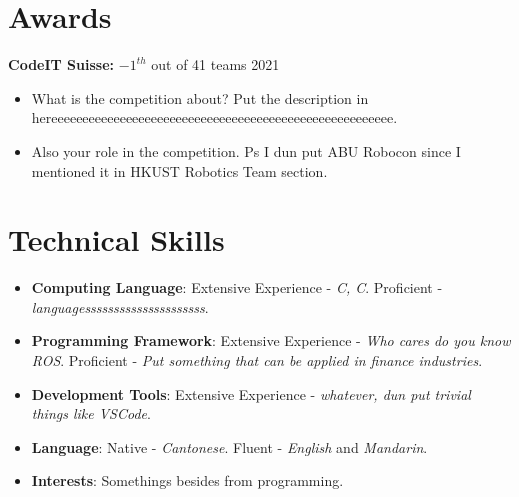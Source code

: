 \documentclass[letterpaper,10.8pt]{article}
\newcommand{\plus}{\raisebox{.4\height}{\scalebox{.6}{+}}}
\begin{document}
\section{Awards}
\textbf{CodeIT Suisse: }$-1^{th}$ out of 41 teams \hfill 2021\\
\begin{itemize}
  \item What is the competition about? Put the description in hereeeeeeeeeeeeeeeeeeeeeeeeeeeeeeeeeeeeeeeeeeeeeeeeeeeeeee.
  \item Also your role in the competition. Ps I dun put ABU Robocon since I mentioned it in HKUST Robotics Team section.
\end{itemize}
\section{Technical Skills}
\begin{itemize}
  \item \textbf{Computing Language}: Extensive Experience - \emph{C, C\plus{}\plus{}}. Proficient - \emph{languagesssssssssssssssssssss}.
  \item \textbf{Programming Framework}: Extensive Experience - \emph{Who cares do you know ROS}. Proficient - \emph{Put something that can be applied in finance industries}.
  \item \textbf{Development Tools}: Extensive Experience - \emph{whatever, dun put trivial things like VSCode}.
  \item \textbf{Language}: Native - \emph{Cantonese}. Fluent - \emph{English} and \emph{Mandarin}.
  \item \textbf{Interests}: Somethings besides from programming.
\end{itemize}
\end{document}
